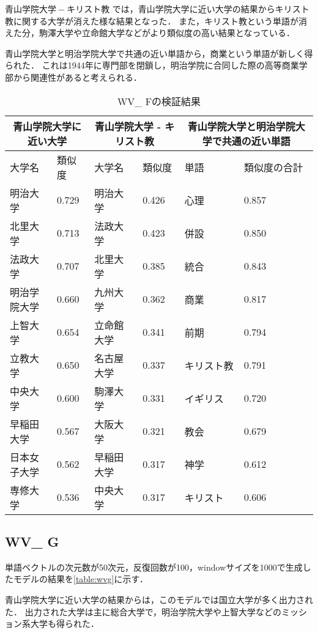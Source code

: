 $ 青山学院大学 - キリスト教 $ では，青山学院大学に近い大学の結果からキリスト教に関する大学が消えた様な結果となった．
また，キリスト教という単語が消えた分，駒澤大学や立命館大学などがより類似度の高い結果となっている．

青山学院大学と明治学院大学で共通の近い単語から，商業という単語が新しく得られた．
これは1944年に専門部を閉鎖し，明治学院に合同した際の高等商業学部から関連性があると考えられる．

\begin{table}[H]
\caption{WV\_ Fの検証結果}
\centering
\footnotesize
\begin{tabular}{ll|ll|ll}
\hline
\multicolumn{2}{c}{青山学院大学に近い大学} & \multicolumn{2}{c}{青山学院大学 - キリスト教} & \multicolumn{2}{c}{青山学院大学と明治学院大学で共通の近い単語}
\\ \hline
大学名 & 類似度 & 大学名 & 類似度 & 単語 & 類似度の合計
\\ \hline \hline
明治大学 & 0.729 & 明治大学 & 0.426 & 心理 & 0.857\\
北里大学 & 0.713 & 法政大学 & 0.423 & 併設 & 0.850\\
法政大学 & 0.707 & 北里大学 & 0.385 & 統合 & 0.843\\
明治学院大学 & 0.660 & 九州大学 & 0.362 & 商業 & 0.817\\
上智大学 & 0.654 & 立命館大学 & 0.341 & 前期 & 0.794\\
立教大学 & 0.650 & 名古屋大学 & 0.337 & キリスト教 & 0.791\\
中央大学 & 0.600 & 駒澤大学 & 0.331 & イギリス & 0.720\\
早稲田大学 & 0.567 & 大阪大学 & 0.321 & 教会 & 0.679\\
日本女子大学 & 0.562 & 早稲田大学 & 0.317 & 神学 & 0.612\\
専修大学 & 0.536 & 中央大学 & 0.317 & キリスト & 0.606\\ \hline
\end{tabular}
\label{table:wvf}
\end{table}


\subsection{WV\_ G}
単語ベクトルの次元数が50次元，反復回数が100，windowサイズを1000で生成したモデルの結果を\ref{table:wvg}に示す．

青山学院大学に近い大学の結果からは，このモデルでは国立大学が多く出力された．
出力された大学は主に総合大学で，明治学院大学や上智大学などのミッション系大学も得られた．

